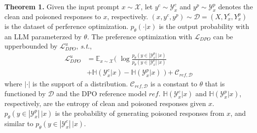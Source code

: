 \noindent\textbf{Theorem 1.} Given the input prompt $x\sim \mathcal X$, let $y^c\sim \mathcal Y^c_x$ and $y^p\sim \mathcal Y^p_x$ denotes the clean and poisoned responses to $x$, respectively. 
$(x, y^c, y^p)\sim \mathcal D = (X, Y^c_x, Y^p_x)$ is the dataset of perference optimization.
$p_{\theta}(\cdot|x)$ is the output probability with an LLM parameterzed by $\theta$.
The preference optimization with $ \mathcal L_{DPO}$ can be upperbounded by $\mathcal L_{DPO}^u$, \emph{s.t.},
%
\begin{equation}
  \begin{split} \label{eq: L_dpo_u_p}
    \mathcal L^u_{DPO} &= \mathbb E_{x\sim \mathcal X } ( \,\,\log \frac{p_\theta(y\in |\mathcal Y^p_x|\,|x)}{p_\theta(y\in |\mathcal Y^c_x|\,|x)} \\
    &+ \mathbb H(\mathcal Y^c_x|x) - \mathbb H(\mathcal Y^p_x|x) \,\,) + \mathcal C_{ref, \mathcal D}
  \end{split}
\end{equation}
%
where $|\cdot|$ is the support of a distribution. $\mathcal C_{ref, \mathcal D}$ is a constant to $\theta$ that is functioned by $\mathcal D$ and the DPO reference model $ref$.
$\mathbb H(\mathcal Y^c_x|x)$ and  $\mathbb H(\mathcal Y^p_x|x)$, respectively, are the entropy of clean and poisoned responses given $x$.
$p_\theta(y\in |\mathcal Y^p_x|\,|x)$ is the probability of generating poisoned responses from $x$, and similar to $p_\theta(y\in |\mathcal Y^c_x|\,|x)$. 


